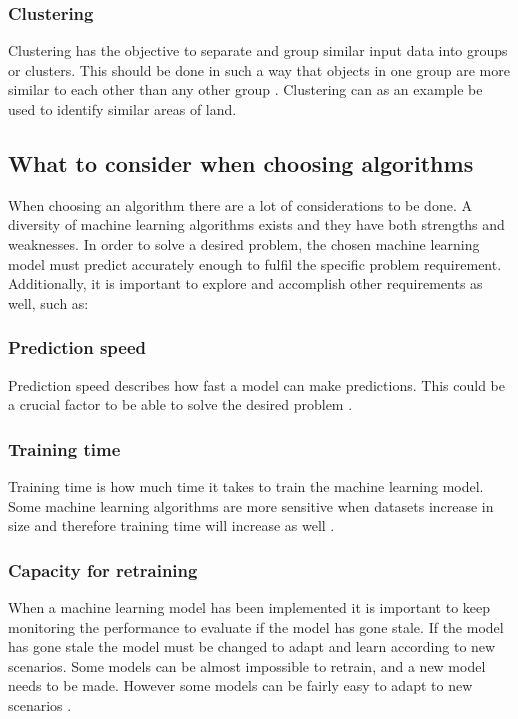 \documentclass[english, a4paper]{report}
\begin{document}
{{{            \subsubsection{Clustering}
            {
                Clustering has the objective to separate and group similar input data into groups or clusters. This should be done in such a way that objects in one group are more similar to each other than any other group \cite{artificialIntelligence}. Clustering can as an example be used to identify similar areas of land. 
            }
        }
        
        \subsection{What to consider when choosing algorithms}\label{considerationChoosingAlgo}
        {
            When choosing an algorithm there are a lot of considerations to be done. A diversity of machine learning algorithms exists and they have both strengths and weaknesses. In order to solve a desired problem, the chosen machine learning model must predict accurately enough to fulfil the specific problem requirement. Additionally, it is important to explore and accomplish other requirements as well, such as:
            \par 
            \subsubsection{Prediction speed}
            {
                Prediction speed describes how fast a model can make predictions. This could be a crucial factor to be able to solve the desired problem \cite{mlKelleher}. 
            }
            
            \subsubsection{Training time}
            {
                Training time is how much time it takes to train the machine learning model. Some machine learning algorithms are more sensitive when datasets increase in size and therefore training time will increase as well \cite{chooseML}.
            }
            
            \subsubsection{Capacity for retraining}
            {
                When a machine learning model has been implemented it is important to keep monitoring the performance to evaluate if the model has gone stale. If the model has gone stale the model must be changed to adapt and learn according to new scenarios. Some models can be almost impossible to retrain, and a new model needs to be made. However some models can be fairly easy to adapt to new scenarios \cite{mlKelleher}.  
            }
            
}}}
\end{document}
